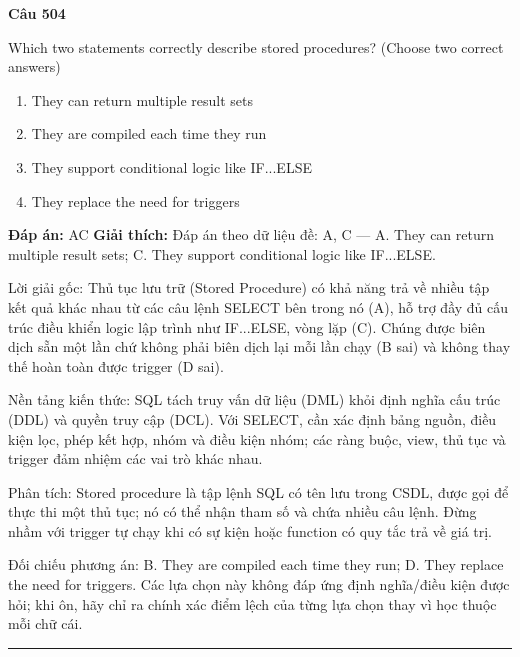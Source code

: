 \documentclass[11pt,a4paper]{article}
\newenvironment{question}[1]{%
  \par\vspace{1em}\noindent\textbf{\large Câu #1}\par\vspace{0.4em}
}{%
  \par\vspace{1em}\hrule\vspace{0.6em}
}
\newenvironment{choices}{%
  \begin{enumerate}[label=\textbf{\Alph*.},leftmargin=2.2em,itemsep=2pt,topsep=3pt]
}{%
  \end{enumerate}
}
\newcommand{\choice}{\item}
\begin{document}
\begin{question}{504}
Which two statements correctly describe stored procedures? (Choose two correct answers)
\begin{choices}
\choice They can return multiple result sets
\choice They are compiled each time they run
\choice They support conditional logic like IF...ELSE
\choice They replace the need for triggers
\end{choices}
\textbf{Đáp án:} AC
\textbf{Giải thích:} Đáp án theo dữ liệu đề: A, C — A. They can return multiple result sets; C. They support conditional logic like IF...ELSE.

Lời giải gốc: Thủ tục lưu trữ (Stored Procedure) có khả năng trả về nhiều tập kết quả khác nhau từ các câu lệnh SELECT bên trong nó (A), hỗ trợ đầy đủ cấu trúc điều khiển logic lập trình như IF...ELSE, vòng lặp (C). Chúng được biên dịch sẵn một lần chứ không phải biên dịch lại mỗi lần chạy (B sai) và không thay thế hoàn toàn được trigger (D sai).

Nền tảng kiến thức: SQL tách truy vấn dữ liệu (DML) khỏi định nghĩa cấu trúc (DDL) và quyền truy cập (DCL). Với SELECT, cần xác định bảng nguồn, điều kiện lọc, phép kết hợp, nhóm và điều kiện nhóm; các ràng buộc, view, thủ tục và trigger đảm nhiệm các vai trò khác nhau.

Phân tích: Stored procedure là tập lệnh SQL có tên lưu trong CSDL, được gọi để thực thi một thủ tục; nó có thể nhận tham số và chứa nhiều câu lệnh. Đừng nhầm với trigger tự chạy khi có sự kiện hoặc function có quy tắc trả về giá trị.

Đối chiếu phương án: B. They are compiled each time they run; D. They replace the need for triggers. Các lựa chọn này không đáp ứng định nghĩa/điều kiện được hỏi; khi ôn, hãy chỉ ra chính xác điểm lệch của từng lựa chọn thay vì học thuộc mỗi chữ cái.
\end{question}
\end{document}
